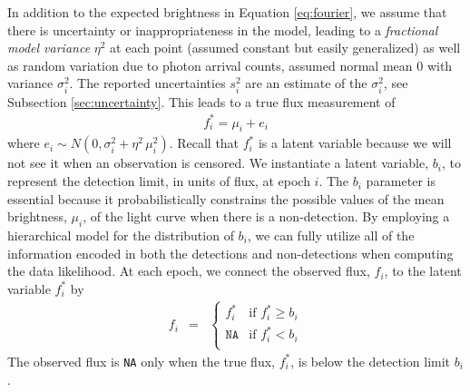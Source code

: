 \documentclass[12pt,preprint]{aastex}
\newcommand{\fobs}{f_i}
\newcommand{\ftrue}{f_i^*}
\begin{document}
In addition to the expected brightness in Equation \ref{eq:fourier}, we assume that there is uncertainty or inappropriateness in the model, leading to a \emph{fractional model variance} $\eta^2$ at each point (assumed constant but easily generalized) as well as random variation due to photon arrival counts, assumed normal mean 0 with variance $\sigma_i^2$. The reported uncertainties $s_i^2$ are an estimate of the $\sigma_i^2$, see Subsection \ref{sec:uncertainty}. This leads to a true flux measurement of
\begin{eqnarray}\displaystyle
\ftrue = \mu_i + e_i
\label{eq:truefluxdef}
\end{eqnarray}
where $e_i \sim N(0,\sigma_i^2 + \eta^2\,\mu_i^2)$. Recall that $f_i^*$ is a latent variable because we will not see it when an observation is censored. We instantiate a latent variable, $b_i$, to represent the detection limit, in units of flux, at epoch $i$.  The $b_i$ parameter is essential because it probabilistically constrains the possible values of the mean brightness, $\mu_i$, of the light curve when there is a non-detection.  By employing a hierarchical model for the distribution of $b_i$, we can fully utilize all of the information encoded in both the detections and non-detections when computing the data likelihood.   At each epoch, we connect the observed flux, $\fobs$, to the latent variable $\ftrue$ by
\begin{eqnarray}\displaystyle
\fobs &=& \left\{\begin{array}{ll}
  \ftrue & \mbox{if $\ftrue \ge b_i$} \\
  \texttt{NA} & \mbox{if $\ftrue < b_i$} \\
\end{array} \right.
\end{eqnarray}
The observed flux is \texttt{NA} only when the true flux, $\ftrue$, is below the detection limit $b_i$.
\end{document}
